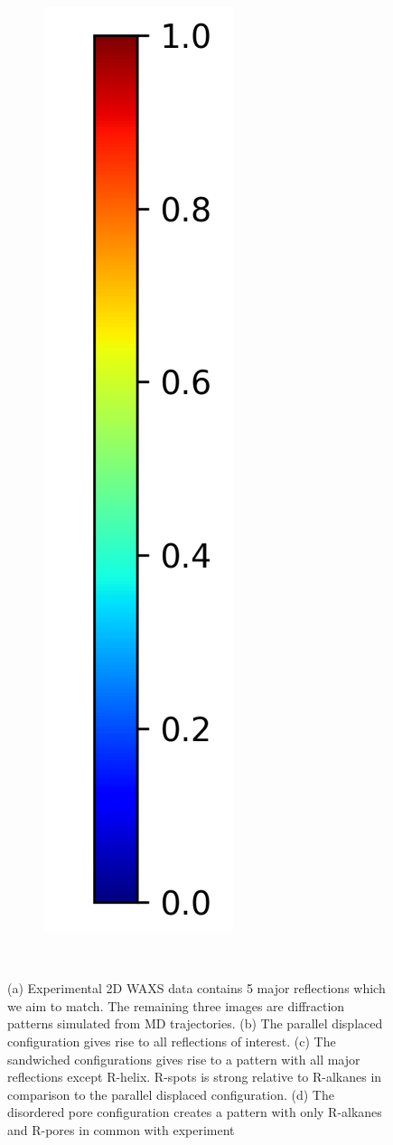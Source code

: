 \documentclass{article}
\begin{document}
\begin{figure}[ht]
\begin{subfigure}{0.14\linewidth}
	\includegraphics[width=\linewidth]{colorbar_jet.png}
\end{subfigure}
\caption{(a) Experimental 2D WAXS data contains 5 major reflections which we aim to match. The remaining 
three images are diffraction patterns simulated from MD trajectories. (b) The parallel displaced
configuration gives rise to all reflections of interest. (c) The sandwiched configurations gives rise to a
pattern with all major reflections except R-helix. R-spots is strong relative to R-alkanes in comparison
to the parallel displaced configuration. (d) The disordered pore configuration creates a pattern with only
R-alkanes and R-pores in common with experiment}~\label{fig:xrd}
\end{figure}
\end{document}
